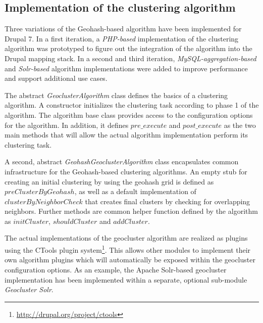 \subsection{Implementation of the clustering algorithm}
\label{chapter:impl-alg}

Three variations of the Geohash-based algorithm have been implemented for Drupal 7. In a first iteration, a \textit{PHP-based} implementation of the clustering algorithm was prototyped to figure out the integration of the algorithm into the Drupal mapping stack. In a second and third iteration, \textit{MySQL-aggregation-based} and \textit{Solr-based} algorithm implementations were added to improve performance and support additional use cases.

The abstract \textit{GeoclusterAlgorithm} class defines the basics of a clustering algorithm. A constructor initializes the clustering task according to phase 1 of the algorithm. The algorithm base class provides access to the configuration options for the algorithm. In addition, it defines $pre\_execute$ and $post\_execute$ as the two main methods that will allow the actual algorithm implementation perform its clustering task.

A second, abstract \textit{GeohashGeoclusterAlgorithm} class encapsulates common infrastructure for the Geohash-based clustering algorithms. An empty stub for creating an initial clustering by using the geohash grid is defined as $preClusterByGeohash$, as well as a default implementation of $clusterByNeighborCheck$ that creates final clusters by checking for overlapping neighbors. Further methods are common helper function defined by the algorithm as $initCluster$, $shouldCluster$ and $addCluster$.

The actual implementations of the geocluster algorithm are realized as plugins using the CTools plugin system\footnote{\url{http://drupal.org/project/ctools}}. This allows other modules to implement their own algorithm plugins which will automatically be exposed within the geocluster configuration options. As an example, the Apache Solr-based geocluster implementation has been implemented within a separate, optional sub-module \textit{Geocluster Solr}. 

